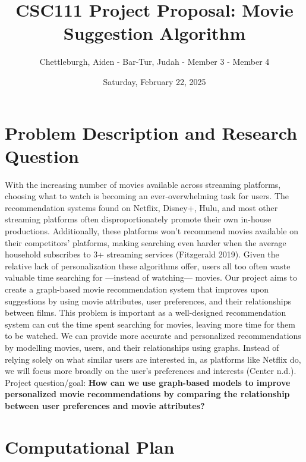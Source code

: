\documentclass[11pt]{article}
\title{CSC111 Project Proposal: Movie Suggestion Algorithm}
\author{Chettleburgh, Aiden - Bar-Tur, Judah - Member 3 - Member 4}
\date{Saturday, February 22, 2025}
\begin{document}
\maketitle

\section*{Problem Description and Research Question}
With the increasing number of movies available across streaming platforms, choosing what to watch is becoming an ever-overwhelming task for users. The recommendation systems found on Netflix, Disney+, Hulu, and most other streaming platforms often disproportionately promote their own in-house productions. Additionally, these platforms won't recommend movies available on their competitors' platforms, making searching even harder when the average household subscribes to 3+ streaming services (Fitzgerald 2019). Given the relative lack of personalization these algorithms offer, users all too often waste valuable time searching for —instead of watching— movies. Our project aims to create a graph-based movie recommendation system that improves upon suggestions by using movie attributes, user preferences, and their relationships between films. This problem is important as a well-designed recommendation system can cut the time spent searching for movies, leaving more time for them to be watched. We can provide more accurate and personalized recommendations by modelling movies, users, and their relationships using graphs. Instead of relying solely on what similar users are interested in, as platforms like Netflix do, we will focus more broadly on the user's preferences and interests (Center n.d.).\\
Project question/goal: \textbf{How can we use graph-based models to improve personalized movie recommendations by comparing the relationship between user preferences and movie attributes?}

\section*{Computational Plan}
\end{document}
